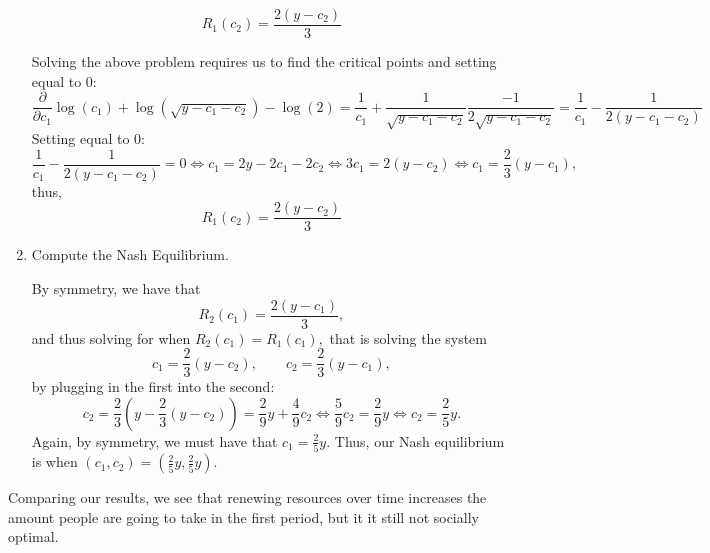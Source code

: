 \documentclass[11pt]{article}
\begin{document}
\begin{problem}
\begin{problem}
\begin{enumerate}
\[
R_1(c_2) = \frac{2(y - c_2)}{3}
\]

\begin{solution}
        Solving the above problem requires us to find the critical points and setting equal to $0:$
    \[\frac{\partial}{\partial c_1}\log(c_1) + \log(\sqrt{y - c_1 - c_2}) - \log(2) = \frac{1}{c_1} + \frac{1}{\sqrt{y-c_1-c_2}}\frac{-1}{2\sqrt{y - c_1 -c_2}} = \frac{1}{c_1} - \frac{1}{2(y -c_1 -c_2)}\] Setting equal to $0:$
    \[\frac{1}{c_1} - \frac{1}{2(y -c_1 -c_2)} = 0 \iff c_1 = 2y - 2c_1 -2c_2 \iff 3c_1 = 2(y-c_2) \iff c_1 = \frac{2}{3}(y-c_1),\] thus, 
    \[R_1(c_2) = \frac{2(y - c_2)}{3}\]

\end{solution}
\item 
Compute the Nash Equilibrium.
\begin{solution}
    By symmetry, we have that 
    \[R_2(c_1) = \frac{2(y - c_1)}{3},\] and thus solving for when $R_2(c_1) = R_1(c_1),$ that is solving the system 
    \[c_1 = \frac{2}{3}(y-c_2), \qquad c_2 = \frac{2}{3}(y-c_1),\] by plugging in the first into the second:
    \[c_2 = \frac{2}{3}(y-\frac{2}{3}(y-c_2)) = \frac{2}{9}y + \frac{4}{9}c_2 \iff \frac{5}{9}c_2 = \frac{2}{9}y \iff c_2 = \frac{2}{5}y.\] Again, by symmetry, we must have that $c_1 = \frac{2}{5}y.$ Thus, our Nash equilibrium is when $(c_1, c_2) = (\frac{2}{5}y, \frac{2}{5}y).$ 
\end{solution}
\end{enumerate}
\begin{reflection}
Comparing our results, we see that renewing resources over time increases the amount people are going to take in the first period, but it it still not socially optimal.
\end{reflection}



\end{problem}

\end{problem}
\end{document}
